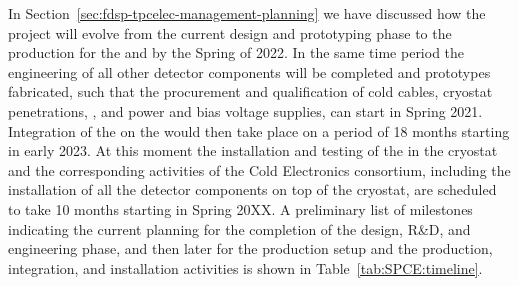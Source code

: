 In Section~\ref{sec:fdsp-tpcelec-management-planning} we have 
discussed how the project will evolve from the current design
and prototyping phase to the production for the 
and  by the Spring of 2022. In the same time 
period the engineering of all other detector components will
be completed and prototypes fabricated, such that the procurement
and qualification of cold cables, cryostat penetrations, ,
and power and bias voltage supplies, can start in Spring 2021.
Integration of the  on the  would then
take place on a period of 18 months starting in early 2023. At
this moment the installation and testing of the  in 
the cryostat and the corresponding activities of the Cold
Electronics consortium, including the installation of all the
detector components on top of the cryostat, are scheduled to
take 10 months starting in Spring 20XX. A preliminary list of 
milestones indicating the current planning for the completion of 
the design, R\&D, and engineering phase, and then later for 
the production setup and the production, integration,
and installation activities is shown in Table~\ref{tab:SPCE:timeline}.

